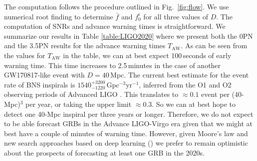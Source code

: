 \documentclass[11pt,a4paper]{article}
\begin{document}
The computation follows the procedure outlined in Fig.~\ref{fig:flow}. We use numerical root finding to determine $\bar{f}$ and $f_0^i$ for all three values of $D$. 
The computation of SNRs and advance warning times is straightforward. 
We summarize our results in Table \ref{table:LIGO2020} where we present both the 0PN and the 3.5PN results for the advance warning times
$T_\text{AW}$. As can be seen from the values for $T_\text{AW}$ in the table, we can at best expect 100\,seconds of early warning time.
This time increases to 2.5\,minutes in the case of another GW170817-like event with $D=40\,$Mpc.
The current best estimate for the event rate of BNS inspirals is $ 1540^{+3200}_{-1220}\,$Gpc$^{-3}$yr$^{-1}$, inferred from the O1 and O2 observing periods of Advanced LIGO \cite{GW170817}.
This translates to $\approx 0.1$ event per (40-Mpc)$^3$ per year, or taking the upper limit $\approx 0.3$. So we can at best hope to detect
one 40-Mpc inspiral per three years or longer.
Therefore, we do not expect to be able forecast GRBs in the Advance LIGO-Virgo era given that we might at best have a couple of minutes of warning time. 
However, given Moore's law and new search approaches based on deep learning (\cite{Gabbard:2017lja}) 
we prefer to remain optimistic about the prospects of forecasting at least one GRB in the 2020s. %
%
%
\end{document}
